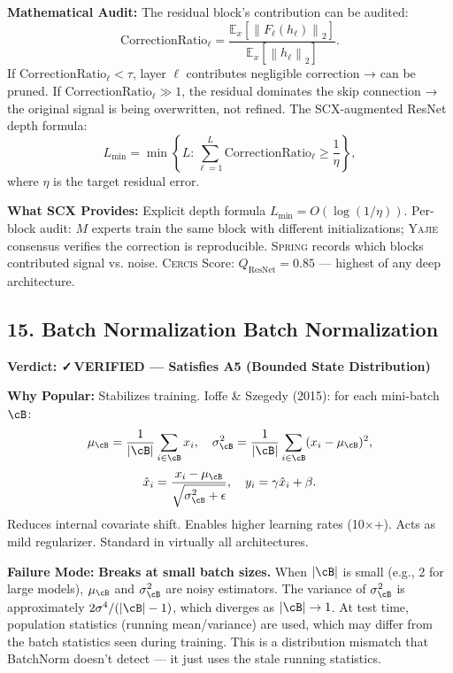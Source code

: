\documentclass[12pt,a4paper]{article}
\theoremstyle{definition}
\newcommand{\verified}{{\color{verifiedcolor}\textbf{✓\,VERIFIED}}}
\newcommand{\Yajie}{\textsc{Yajie}}
\newcommand{\Spring}{\textsc{Spring}}
\newcommand{\Cercis}{\textsc{Cercis}}
\newcommand{\E}{\mathbb{E}}
\newcommand{\norm}[1]{\left\lVert#1\right\rVert}
\newcommand{\auditHeader}[1]{\medskip\noindent\textbf{\large #1}\medskip}
\newcommand{\whyPopular}{\noindent\textbf{Why Popular:} }
\newcommand{\whyFail}{\noindent\textbf{Failure Mode:} }
\newcommand{\whatMissing}{\noindent\textbf{What SCX Provides:} }
\newcommand{\mathAudit}{\noindent\textbf{Mathematical Audit:} }
\begin{document}
\mathAudit{} The residual block's contribution can be audited:
\[
\text{CorrectionRatio}_\ell = \frac{\E_x[\norm{F_\ell(h_\ell)}_2]}{\E_x[\norm{h_\ell}_2]}.
\]
If $\text{CorrectionRatio}_\ell < \tau$, layer $\ell$ contributes negligible correction → can be pruned. If $\text{CorrectionRatio}_\ell \gg 1$, the residual dominates the skip connection → the original signal is being overwritten, not refined. The SCX-augmented ResNet depth formula:
\[
L_{\min} = \min\left\{L : \sum_{\ell=1}^L \text{CorrectionRatio}_\ell \ge \frac{1}{\eta}\right\},
\]
where $\eta$ is the target residual error.

\whatMissing{} Explicit depth formula $L_{\min} = O(\log(1/\eta))$. Per-block audit: $M$ experts train the same block with different initializations; \Yajie{} consensus verifies the correction is reproducible. \Spring{} records which blocks contributed signal vs. noise. \Cercis{} Score: $Q_{\text{ResNet}} = 0.85$ — highest of any deep architecture.

\subsection{15. Batch Normalization Batch Normalization}

\auditHeader{Verdict: \verified{} — Satisfies A5 (Bounded State Distribution)}

\whyPopular{} Stabilizes training. Ioffe \& Szegedy (2015): for each mini-batch $\cB$:
\[
\mu_\cB = \frac{1}{|\cB|}\sum_{i \in \cB} x_i, \quad \sigma_\cB^2 = \frac{1}{|\cB|}\sum_{i \in \cB} (x_i - \mu_\cB)^2,
\]
\[
\hat{x}_i = \frac{x_i - \mu_\cB}{\sqrt{\sigma_\cB^2 + \epsilon}}, \quad y_i = \gamma \hat{x}_i + \beta.
\]
Reduces internal covariate shift. Enables higher learning rates (10$\times$+). Acts as mild regularizer. Standard in virtually all architectures.

\whyFail{} \textbf{Breaks at small batch sizes.} When $|\cB|$ is small (e.g., 2 for large models), $\mu_\cB$ and $\sigma_\cB^2$ are noisy estimators. The variance of $\sigma_\cB^2$ is approximately $2\sigma^4 / (|\cB|-1)$, which diverges as $|\cB| \to 1$. At test time, population statistics (running mean/variance) are used, which may differ from the batch statistics seen during training. This is a distribution mismatch that BatchNorm doesn't detect — it just uses the stale running statistics.
\end{document}
